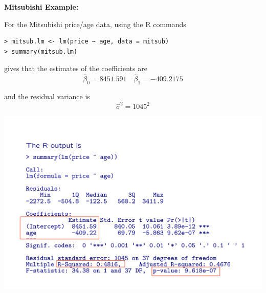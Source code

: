 \documentclass[landscape]{slides}
\newcommand{\heading}[1]{%
  \begin{center}
    \large\bf \color{red}
        #1
  \end{center}
  \vspace{1ex minus 1ex}}
\begin{document}
\begin{slide}
\heading{Mitsubishi Example:}

For the Mitsubishi price/age data, using the R commands 

\begin{Verbatim}[commandchars=\\\{\}]
> mitsub.lm <- lm(price ~ age, data = mitsub)
> summary(mitsub.lm)
\end{Verbatim}


%


gives that the estimates of the coefficients are
$$\hat{\beta}_0=8451.591 \quad \hat{\beta}_1=-409.2175$$

and the residual variance is
$$\hat{\sigma}^2=1045^2$$

\end{slide}

\begin{slide}
	
	\begin{center}
		\includegraphics[width=1\textwidth]{output.png}
	\end{center}
\end{slide}
\end{document}
